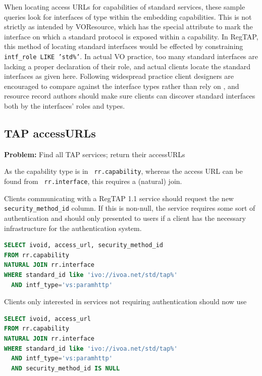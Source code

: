 \documentclass[11pt,a4paper]{ivoa}
\newcommand{\rtent}[1]{\texttt{\color{rtcolor} #1}}
\begin{document}
When locating access URLs for capabilities of standard services, these
sample queries look for interfaces of type  within
the embedding capabilities.  This is not strictly as intended by
VOResource, which has the special  attribute to mark the
interface on which a standard protocol is exposed within a capability.
In RegTAP, this method of locating standard interfaces would be effected
by constraining \texttt{intf\_role LIKE 'std\%'}.  In actual VO
practice, too many standard interfaces are lacking a proper declaration
of their role, and actual clients locate the standard interfaces as
given here.  Following widespread practice client designers are
encouraged to compare against the interface types rather than rely on
, and resource record authors should make sure
clients can discover standard interfaces both by the interfaces' roles
and types.


\subsection{TAP accessURLs}
\textbf{Problem:} Find all TAP services; return their accessURLs

As the capability type is in 
\rtent{rr.capability}, whereas the access URL can be
found from 
\rtent{rr.interface}, this requires
a (natural) join.

Clients communicating with a RegTAP 1.1 service should request the new
\rtent{security\_method\_id} column.  If this is non-null, the service
requires some sort of authentication and should only presented to users
if a client has the necessary infrastructure for the authentication
system.

\begin{lstlisting}[language=SQL,flexiblecolumns=true]
SELECT ivoid, access_url, security_method_id
FROM rr.capability
NATURAL JOIN rr.interface
WHERE standard_id like 'ivo://ivoa.net/std/tap%'
  AND intf_type='vs:paramhttp'
\end{lstlisting}

Clients only interested in services not requiring authentication should
now use

\begin{lstlisting}[language=SQL,flexiblecolumns=true]
SELECT ivoid, access_url
FROM rr.capability
NATURAL JOIN rr.interface
WHERE standard_id like 'ivo://ivoa.net/std/tap%'
  AND intf_type='vs:paramhttp'
  AND security_method_id IS NULL
\end{lstlisting}
\end{document}
